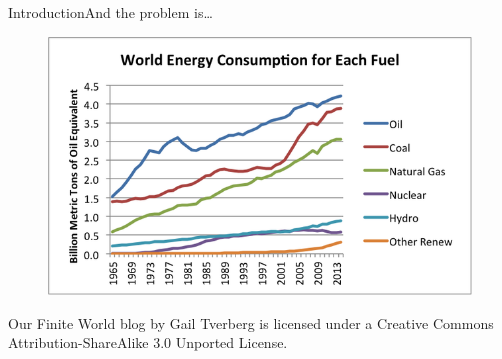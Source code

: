 





    \begin{frame}{Introduction}{And the problem is\ldots}


%
%
%
%

        \begin{figure}[h]

            \centering

            \includegraphics[width=.75\textwidth]{images/world-energy-consumption-for-each-fuel-2014-line} 

            \label{fig:worldEnergyConsumption}


        \end{figure}



        \footnotesize{Our Finite World blog by Gail Tverberg is licensed under a Creative Commons Attribution-ShareAlike 3.0 Unported License.}

    \end{frame}


